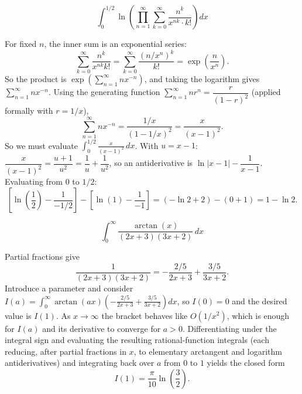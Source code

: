 \begin{questions}
\question \[\int_0^{1/2} \ln\left(\prod_{n=1}^{\infty}\sum_{k=0}^{\infty}\frac{n^k}{x^{nk}\cdot k!}\right)dx\]
\begin{solution}
For fixed $n$, the inner sum is an exponential series:
\[
\sum_{k=0}^\infty \frac{n^k}{x^{nk}k!}=\sum_{k=0}^\infty \frac{(n/x^n)^k}{k!}=\exp\!\left(\frac{n}{x^n}\right).
\]
So the product is $\exp\!\left(\sum_{n=1}^\infty n x^{-n}\right)$, and taking the logarithm gives $\sum_{n=1}^\infty n x^{-n}$. Using the generating function $\sum_{n=1}^\infty n r^n=\dfrac{r}{(1-r)^2}$ (applied formally with $r=1/x$),
\[
\sum_{n=1}^\infty n x^{-n}=\frac{1/x}{\left(1-1/x\right)^2}=\frac{x}{(x-1)^2}.
\]
So we must evaluate $\displaystyle\int_0^{1/2}\frac{x}{(x-1)^2}\,dx$. With $u=x-1$: $\dfrac{x}{(x-1)^2}=\dfrac{u+1}{u^2}=\dfrac1u+\dfrac1{u^2}$, so an antiderivative is $\ln|x-1|-\dfrac1{x-1}$.
Evaluating from $0$ to $1/2$:
\[
\left[\ln\!\left(\frac12\right)-\frac{1}{-1/2}\right]-\left[\ln(1)-\frac{1}{-1}\right]=(-\ln2+2)-(0+1)=1-\ln2.
\]
\end{solution}

\question \[\int_0^\infty \frac{\arctan(x)}{(2x+3)(3x+2)}\,dx\]
\begin{solution}
Partial fractions give
\[
\frac{1}{(2x+3)(3x+2)}=-\frac{2/5}{2x+3}+\frac{3/5}{3x+2}.
\]
Introduce a parameter and consider $I(a)=\displaystyle\int_0^\infty \arctan(ax)\left(-\frac{2/5}{2x+3}+\frac{3/5}{3x+2}\right)dx$, so $I(0)=0$ and the desired value is $I(1)$. As $x\to\infty$ the bracket behaves like $O(1/x^2)$, which is enough for $I(a)$ and its derivative to converge for $a>0$. Differentiating under the integral sign and evaluating the resulting rational-function integrals (each reducing, after partial fractions in $x$, to elementary arctangent and logarithm antiderivatives) and integrating back over $a$ from $0$ to $1$ yields the closed form
\[
I(1)=\frac{\pi}{10}\ln\!\left(\frac32\right).
\]
\end{solution}

\end{questions}


